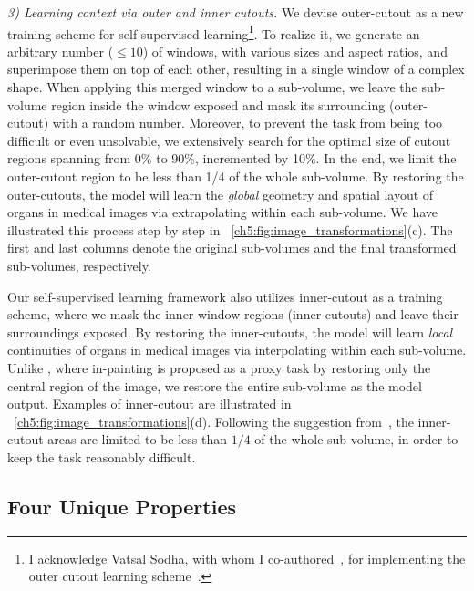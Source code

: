\textit{3) Learning context via outer and inner cutouts.} We devise outer-cutout as a new training scheme for self-supervised learning\footnote{I acknowledge Vatsal Sodha, with whom I co-authored~\citet{zhou2019models,zhou2021models}, for implementing the outer cutout learning scheme~\citep{sodha2020self}.}. To realize it, we generate an arbitrary number ($\leq 10$) of windows, with various sizes and aspect ratios, and superimpose them on top of each other, resulting in a single window of a complex shape. When applying this merged window to a sub-volume, we leave the sub-volume region inside the window exposed and mask its surrounding (\ie outer-cutout) with a random number. 
Moreover, to prevent the task from being too difficult or even unsolvable, we extensively search for the optimal size of cutout regions spanning from 0\% to 90\%, incremented by 10\%. In the end, we limit the outer-cutout region to be less than 1/4 of the whole sub-volume.
By restoring the outer-cutouts, the model will learn the {\em global} geometry and spatial layout of organs in medical images via extrapolating within each sub-volume. We have illustrated this process step by step in \figurename~\ref{ch5:fig:image_transformations}(c). The first and last columns denote the original sub-volumes and the final transformed sub-volumes, respectively. 

Our self-supervised learning framework also utilizes inner-cutout as a training scheme, where we mask the inner window regions (\ie inner-cutouts) and leave their surroundings exposed. By restoring the inner-cutouts, the model will learn {\em local} continuities of organs in medical images via interpolating within each sub-volume. Unlike \citet{pathak2016context}, where in-painting is proposed as a proxy task by restoring only the central region of the image, we restore the entire sub-volume as the model output. Examples of inner-cutout are illustrated in \figurename~\ref{ch5:fig:image_transformations}(d). 
Following the suggestion from~\citet{pathak2016context}, the inner-cutout areas are limited to be less than $1/4$ of the whole sub-volume, in order to keep the task reasonably difficult.


\subsection{Four Unique Properties}
\label{ch5:approach_property:several_unique_properties}

